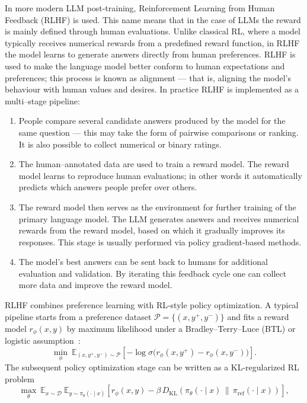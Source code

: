 \documentclass{article}
\numberwithin{equation}{section}
\newcommand{\E}{\mathbb E}
\newcommand{\cD}{\mathcal{D}}
\newcommand{\cP}{\mathcal{P}}
\begin{document}
In more modern LLM post-training, Reinforcement Learning from Human Feedback (RLHF) is used. This name means that in the case of LLMs the reward is mainly defined through
human evaluations. Unlike classical RL, where a model typically receives numerical rewards from a predefined reward function, in RLHF the model learns to generate answers directly from human preferences. RLHF is used to make the language model better conform to human expectations and preferences; this process is known as alignment --- that is, aligning the model's behaviour with human values and desires. In practice RLHF is implemented as a multi--stage pipeline:
\begin{enumerate}
  \item People compare several candidate answers produced by the model for the same question --- this may take the form of pairwise comparisons or ranking.  It is also possible to collect numerical or binary ratings.
  \item The human--annotated data are used to train a reward model. The reward model learns to reproduce human evaluations; in other words it automatically predicts which answers people prefer over others.
  \item The reward model then serves as the environment for further training of the primary language model. The LLM generates answers and receives numerical rewards from the reward model, based on which it gradually improves its responses. This stage is usually performed via policy gradient-based methods.
  \item The model's best answers can be sent back to humans for additional evaluation and validation. By iterating this feedback cycle one can collect more data and improve the reward model.
\end{enumerate}
RLHF combines preference learning with RL-style policy optimization. A typical pipeline starts from a preference dataset $\cP=\{(x,y^+,y^-)\}$ and fits a reward model $r_\phi(x,y)$ by maximum likelihood under a Bradley--Terry--Luce (BTL) or logistic assumption~\cite{bradley1952rank}:
\begin{equation}\label{eq:rm_loss}
\min_{\phi}\ \E_{(x,y^+,y^-)\sim\cP}
\left[
-\log \sigma\!\big(r_\phi(x,y^+)-r_\phi(x,y^-)\big)
\right].
\end{equation}
The subsequent policy optimization stage can be written as a KL-regularized RL problem
\begin{equation}\label{eq:rlhf_kl}
\max_{\theta}\ \E_{x\sim\cD}\ \E_{y\sim\pi_\theta(\cdot\mid x)}
\left[
r_\phi(x,y)-\beta\,D_{\mathrm{KL}}\!\left(\pi_\theta(\cdot\mid x)\,\|\,\pi_{\mathrm{ref}}(\cdot\mid x)\right)
\right],
\end{equation}
\end{document}
